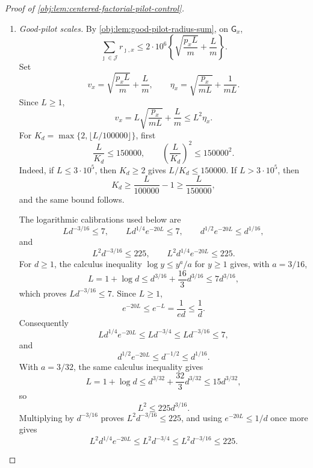 \documentclass[11pt]{article}
\begin{document}
\begin{proof}[Proof of \cref{obj:lem:centered-factorial-pilot-control}]
\begin{enumerate}
\cref{obj:def:jackson-factorial-estimator} therefore gives
\[
|T_x^{\mathrm{JF}}-\bar f_\epsilon(q_x)|
\le
F\|b_x-q_x\|_1+d^{1/4}F\sum_{\jmath\in\mathcal J}r_{\jmath,x}
\le
2d^{1/4}F\,\Gamma_x(N').
\]
With \(\mu_x^{\mathrm{pil}}=\bigotimes_{\jmath}\operatorname{Pois}(m q_\jmath)\) and
\(\mu_x^{\mathrm{eval}}=\bigotimes_{\jmath}\operatorname{Pois}(m q_\jmath)\), set
\[
\mathrm{PF}_{1,x}
=
\int_{\mathsf G_x^c}
|T_x^{\mathrm{JF}}-\bar f_\epsilon(q_x)|
\,d(\mu_x^{\mathrm{pil}}\otimes\mu_x^{\mathrm{eval}})
\]
and
\[
\mathrm{PF}_{2,x}
=
\int_{\mathsf G_x^c}
(T_x^{\mathrm{JF}}-\bar f_\epsilon(q_x))^2
\,d(\mu_x^{\mathrm{pil}}\otimes\mu_x^{\mathrm{eval}}).
\]

\item \emph{Good-pilot scales.}
By \cref{obj:lem:good-pilot-radius-sum}, on \(\mathsf G_x\),
\[
\sum_{\jmath\in\mathcal J}r_{\jmath,x}
\le
2\cdot10^6
\left\{\sqrt{\frac{p_xL}{m}}+\frac Lm\right\}.
\]
Set
\[
v_x=\sqrt{\frac{p_xL}{m}}+\frac Lm,\qquad
\eta_x=\sqrt{\frac{p_x}{mL}}+\frac1{mL}.
\]
Since \(L\ge1\),
\[
v_x=L\sqrt{\frac{p_x}{mL}}+\frac Lm\le L^2\eta_x.
\]
For \(K_d=\max\{2,\lfloor L/100000\rfloor\}\), first
\[
\frac L{K_d}\le150000,
\qquad
\left(\frac L{K_d}\right)^2\le150000^2 .
\]
Indeed, if \(L\le3\cdot10^5\), then \(K_d\ge2\) gives \(L/K_d\le150000\).  If
\(L>3\cdot10^5\), then
\[
K_d\ge \frac L{100000}-1\ge \frac L{150000},
\]
and the same bound follows.

The logarithmic calibrations used below are
\[
L d^{-3/16}\le7,
\qquad
L d^{1/4}e^{-20L}\le7,
\qquad
d^{1/2}e^{-20L}\le d^{1/16},
\]
and
\[
L^2d^{-3/16}\le225,
\qquad
L^2d^{1/4}e^{-20L}\le225 .
\]
For \(d\ge1\), the calculus inequality \(\log y\le y^a/a\) for \(y\ge1\) gives, with
\(a=3/16\),
\[
L=1+\log d\le d^{3/16}+\frac{16}{3}d^{3/16}\le7d^{3/16},
\]
which proves \(Ld^{-3/16}\le7\).  Since \(L\ge1\),
\[
e^{-20L}\le e^{-L}=\frac1{ed}\le\frac1d .
\]
Consequently
\[
Ld^{1/4}e^{-20L}\le Ld^{-3/4}\le Ld^{-3/16}\le7,
\]
and
\[
d^{1/2}e^{-20L}\le d^{-1/2}\le d^{1/16}.
\]
With \(a=3/32\), the same calculus inequality gives
\[
L=1+\log d\le d^{3/32}+\frac{32}{3}d^{3/32}\le15d^{3/32},
\]
so
\[
L^2\le225d^{3/16}.
\]
Multiplying by \(d^{-3/16}\) proves \(L^2d^{-3/16}\le225\), and using
\(e^{-20L}\le1/d\) once more gives
\[
L^2d^{1/4}e^{-20L}\le L^2d^{-3/4}
\le L^2d^{-3/16}\le225 .
\]


\end{enumerate}
\end{proof}
\end{document}
